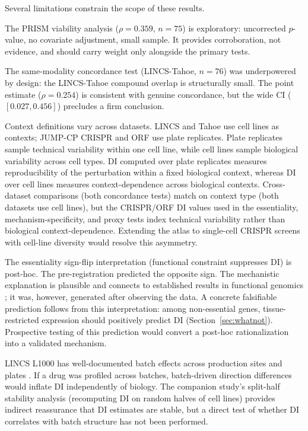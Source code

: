 \documentclass[11pt]{article}
\begin{document}
Several limitations constrain the scope of these results.

The PRISM viability analysis ($\rho = 0.359$, $n = 75$) is exploratory:
uncorrected $p$-value, no covariate adjustment, small sample.  It
provides corroboration, not evidence, and should carry weight only
alongside the primary tests.

The same-modality concordance test (LINCS-Tahoe, $n = 76$) was underpowered by design: the
LINCS-Tahoe compound overlap is structurally small.  The point estimate
($\rho = 0.254$) is consistent with genuine concordance, but the wide CI
($[0.027, 0.456]$) precludes a firm conclusion.

Context definitions vary across datasets.  LINCS and Tahoe use cell
lines as contexts; JUMP-CP CRISPR and ORF use plate replicates.  Plate
replicates sample technical variability within one cell line, while cell
lines sample biological variability across cell types.  DI computed over
plate replicates measures reproducibility of the perturbation within a
fixed biological context, whereas DI over cell lines measures
context-dependence across biological contexts.  Cross-dataset
comparisons (both concordance tests) match on context type (both
datasets use cell lines), but the CRISPR/ORF DI values used in the
essentiality, mechanism-specificity, and proxy tests index technical
variability rather than biological
context-dependence.  Extending the atlas to single-cell CRISPR screens
with cell-line diversity \citep{tahoe2025} would resolve this
asymmetry.

The essentiality sign-flip interpretation (functional constraint
suppresses DI) is post-hoc.  The pre-registration predicted the
opposite sign.  The mechanistic explanation is plausible and connects to
established results in functional genomics
\citep{funk2022phenotypic, ramezani2025periscope}; it was, however,
generated after observing the data.  A concrete falsifiable prediction
follows from this interpretation: among non-essential genes,
tissue-restricted expression should positively predict DI
(Section~\ref{sec:whatnot}).  Prospective testing of this prediction
would convert a post-hoc rationalization into a validated mechanism.

LINCS L1000 has well-documented batch effects across production sites
and plates \citep{subramanian2017next}.  If a drug was profiled across
batches, batch-driven direction differences would inflate DI
independently of biology.  The companion study's split-half stability
analysis (recomputing DI on random halves of cell lines) provides
indirect reassurance that DI estimates are stable, but a direct test of
whether DI correlates with batch structure has not been performed.
\end{document}
